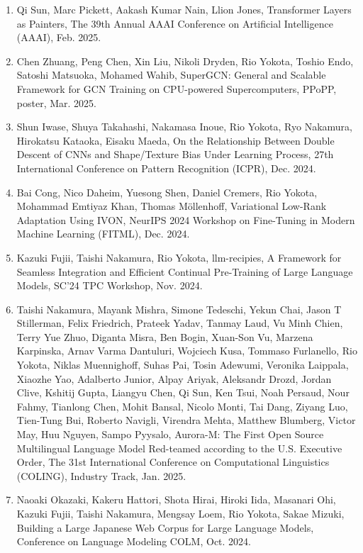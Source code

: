 \documentclass[margin,line]{cv}
\begin{document}
\begin{resume}
\begin{enumerate}
\item Qi Sun, Marc Pickett, Aakash Kumar Nain, Llion Jones, Transformer Layers as Painters, The 39th Annual AAAI Conference on Artificial Intelligence (AAAI), Feb. 2025.

\item Chen Zhuang, Peng Chen, Xin Liu, Nikoli Dryden, Rio Yokota, Toshio Endo, Satoshi Matsuoka, Mohamed Wahib, SuperGCN: General and Scalable Framework for GCN Training on CPU-powered Supercomputers, PPoPP, poster, Mar. 2025.

\item Shun Iwase, Shuya Takahashi, Nakamasa Inoue, Rio Yokota, Ryo Nakamura, Hirokatsu Kataoka, Eisaku Maeda, On the Relationship Between Double Descent of CNNs and Shape/Texture Bias Under Learning Process, 27th International Conference on Pattern Recognition (ICPR), Dec. 2024.

\item Bai Cong, Nico Daheim, Yuesong Shen, Daniel Cremers, Rio Yokota, Mohammad Emtiyaz Khan, Thomas M\"{o}llenhoff, Variational Low-Rank Adaptation Using IVON, NeurIPS 2024 Workshop on Fine-Tuning in Modern Machine Learning (FITML), Dec. 2024.

\item Kazuki Fujii, Taishi Nakamura, Rio Yokota, llm-recipies, A Framework for Seamless Integration and Efficient Continual Pre-Training of Large Language Models, SC’24 TPC Workshop, Nov. 2024.

\item Taishi Nakamura, Mayank Mishra, Simone Tedeschi, Yekun Chai, Jason T Stillerman, Felix Friedrich, Prateek Yadav, Tanmay Laud, Vu Minh Chien, Terry Yue Zhuo, Diganta Misra, Ben Bogin, Xuan-Son Vu, Marzena Karpinska, Arnav Varma Dantuluri, Wojciech Kusa, Tommaso Furlanello, Rio Yokota, Niklas Muennighoff, Suhas Pai, Tosin Adewumi, Veronika Laippala, Xiaozhe Yao, Adalberto Junior, Alpay Ariyak, Aleksandr Drozd, Jordan Clive, Kshitij Gupta, Liangyu Chen, Qi Sun, Ken Tsui, Noah Persaud, Nour Fahmy, Tianlong Chen, Mohit Bansal, Nicolo Monti, Tai Dang, Ziyang Luo, Tien-Tung Bui, Roberto Navigli, Virendra Mehta, Matthew Blumberg, Victor May, Huu Nguyen, Sampo Pyysalo, Aurora-M: The First Open Source Multilingual Language Model Red-teamed according to the U.S. Executive Order, The 31st International Conference on Computational Linguistics (COLING), Industry Track, Jan. 2025.

\item Naoaki Okazaki, Kakeru Hattori, Shota Hirai, Hiroki Iida, Masanari Ohi, Kazuki Fujii, Taishi Nakamura, Mengsay Loem, Rio Yokota, Sakae Mizuki, Building a Large Japanese Web Corpus for Large Language Models, Conference on Language Modeling COLM, Oct. 2024.


\end{enumerate}
\end{resume}
\end{document}
